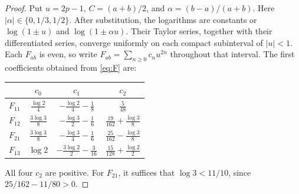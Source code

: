 \documentclass[11pt,a4paper]{article}
\begin{document}
\begin{proof}
Put \(u=2p-1\), \(C=(a+b)/2\), and \(\alpha=(b-a)/(a+b)\).
Here \(|\alpha|\in\{0,1/3,1/2\}\). After substitution, the logarithms
are constants or \(\log(1\pm u)\) and \(\log(1\pm\alpha u)\).
Their Taylor series, together with their differentiated series, converge
uniformly on each compact subinterval of \(|u|<1\).
Each \(F_{ab}\) is even, so write
\(F_{ab}=\sum_{n\ge0}c_nu^{2n}\) throughout that interval.
The first coefficients obtained from \eqref{eq:F} are:
\begin{center}
\small
\begin{tabular}{c c c c}
\toprule
 &\(c_0\)&\(c_1\)&\(c_2\)\\
\midrule
\(F_{11}\)&\(\frac{\log2}{4}\)&\(-\frac{\log2}{4}-\frac18\)&\(\frac5{48}\)\\[3pt]
\(F_{12}\)&\(\frac{3\log3}{8}\)&\(-\frac{\log3}{2}-\frac16\)&\(\frac{19}{162}+\frac{\log3}{8}\)\\[3pt]
\(F_{21}\)&\(\frac{3\log3}{8}\)&\(-\frac{\log3}{4}-\frac16\)&\(\frac{25}{162}-\frac{\log3}{8}\)\\[3pt]
\(F_{13}\)&\(\log2\)&\(-\frac{3\log2}{2}-\frac3{16}\)&\(\frac{15}{128}+\frac{\log2}{2}\)\\
\bottomrule
\end{tabular}
\end{center}
All four \(c_2\) are positive. For \(F_{21}\), it suffices that
\(\log3<11/10\), since \(25/162-11/80>0\).


\end{proof}
\end{document}

